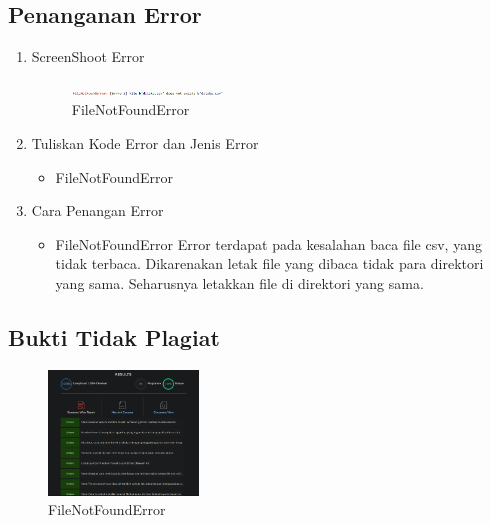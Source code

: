 \subsection{Penanganan Error}
\begin{enumerate}
	\item ScreenShoot Error
	\begin{figure}[H]
		\includegraphics[width=4cm]{figures/1174027/error/3_file_not_found.png}
		\centering
		\caption{FileNotFoundError}
	\end{figure}
	\item Tuliskan Kode Error dan Jenis Error
	\begin{itemize}
		\item FileNotFoundError
	\end{itemize}
	\item Cara Penangan Error
	\begin{itemize}
		\item FileNotFoundError
		\hfill\break
		Error terdapat pada kesalahan baca file csv, yang tidak terbaca. Dikarenakan letak file yang dibaca tidak para direktori yang sama. Seharusnya letakkan file di direktori yang sama. 
	\end{itemize}
\end{enumerate}
\subsection{Bukti Tidak Plagiat}
\begin{figure}[H]
	\includegraphics[width=4cm]{figures/1174027/bukti/3.png}
	\centering
	\caption{FileNotFoundError}
\end{figure}